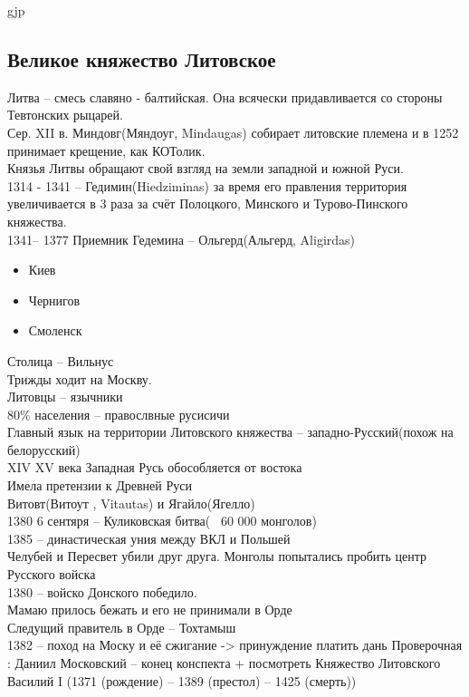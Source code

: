 gjp	 \documentclass[12pt,a4paper]{article}
\begin{document}
\subsection{Великое княжество Литовское}
Литва -- смесь славяно - балтийская. Она всячески придавливается со стороны Тевтонских рыцарей.\\
Сер. XII в. Миндовг(Мяндоуг, Mindaugas) собирает литовские племена и в 1252 принимает крещение, как КОТолик.\\
Князья Литвы обращают свой взгляд на земли западной и южной Руси.  \\
1314 - 1341 -- Гедимин(Hiedziminas) за время его правления территория увеличивается в 3 раза за счёт Полоцкого, Минского и Турово-Пинского княжества.\\
1341-- 1377 Приемник Гедемина -- Ольгерд(Альгерд, Aligirdas)
\begin{itemize}
	\item Киев
	\item Чернигов
	\item Смоленск
\end{itemize}
Столица -- Вильнус\\
Трижды ходит на Москву.\\
Литовцы -- язычники\\
80\% населения -- правослвные русисичи\\
Главный язык на территории Литовского княжества -- западно-Русский(похож на белорусский)\\
XIV XV века Западная Русь обособляется от востока\\
Имела претензии к Древней Руси\\
Витовт(Витоут , Vitautas) и Ягайло(Ягелло)\\
1380 6 сентяря -- Куликовская битва(~ 60 000 монголов)\\
1385 -- династическая уния между ВКЛ и Польшей	\\
Челубей и Пересвет убили друг друга. Монголы попытались пробить центр Русского войска\\
1380 -- войско Донского победило.\\
Мамаю прилось бежать и его не принимали в Орде\\
Следущий правитель в Орде -- Тохтамыш\\
1382 -- поход на Моску и её сжигание -> принуждение платить дань
{\Huge Проверочная : Даниил Московский -- конец конспекта + посмотреть Княжество Литовского}
\\
Василий I (1371 (рождение) -- 1389 (престол) -- 1425 (смерть))\\
\end{document}
